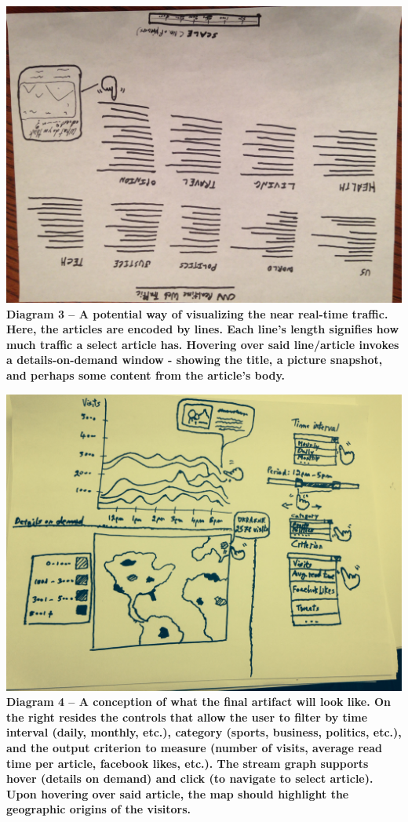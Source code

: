 \documentclass[12pt]{article}
\begin{document}
\noindent\includegraphics[scale=0.2]{img/cnn_categories}
\noindent\textbf{Diagram 3 -- A potential way of visualizing the near real-time traffic. Here, the articles are encoded by lines. Each line's length signifies how much traffic a select article has. Hovering over said line/article invokes a details-on-demand window - showing the title, a picture snapshot, and perhaps some content from the article's body.}

\noindent\includegraphics[scale=0.2]{img/overall_viz}
\noindent\textbf{Diagram 4 -- A conception of what the final artifact will look like. On the right resides the controls that allow the user to filter by time interval (daily, monthly, etc.), category (sports, business, politics, etc.), and the output criterion to measure (number of visits, average read time per article, facebook likes, etc.). The stream graph supports hover (details on demand) and click (to navigate to select article). Upon hovering over said article, the map should highlight the geographic origins of the visitors.}
\end{document}
